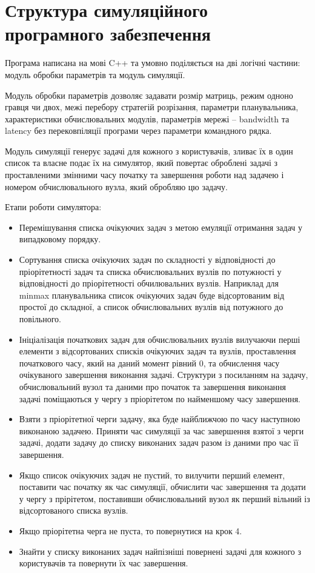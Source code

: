 \section{Структура симуляційного програмного забезпечення}

Програма написана на мові C++ та умовно поділяється на дві логічні частини: модуль обробки параметрів та модуль симуляції.

Модуль обробки параметрів дозволяє задавати розмір матриць, режим одноно гравця чи двох, межі перебору стратегій розрізання, параметри планувальника, характеристики обчислювальних модулів, параметрів мережі – bandwidth та latency без перековпіляції програми через параметри командного рядка.

Модуль симуляції генерує задачі для кожного з користувачів, зливає їх в один список та власне подає їх на симулятор, який повертає оброблені задачі з проставленими змінними часу початку та завершення роботи над задачею і номером обчислювального вузла, який обробляю цю  задачу.

Етапи роботи симулятора:
\begin{itemize}
	\item Перемішування списка очікуючих задач з метою емуляцїї отримання задач у випадковому порядку.
	
	\item Сортування списка очікуючих задач по складності у відповідності до пріорітетності задач та списка обчислювальних вузлів по потужності у відповідності до пріорітетності обчилювальних вузлів. Наприклад для minmax планувальника список очікуючих задач буде відсортованим від простої до складної, а список обчислювальних вузлів від потужного до повільного.
	
	\item Ініціалізація початкових задач для обчислювальних вузлів вилучаючи перші елементи з  відсортованих списків очікуючих задач та вузлів, проставлення початкового часу, який на даний момент рівний 0, та обчислення часу очікуваного завершення виконання задачі. Структури з посиланням на задачу, обчислювальний вузол та даними про початок та завершення виконання задачі поміщаються у чергу з пріорітетом по найменшому часу завершення.
	
	\item Взяти з пріорітетної черги задачу, яка буде найближчою по часу наступною виконаною задачею. Приняти час симуляції за час завершення взятої з черги задачі, додати задачу до списку виконаних задач разом із даними про час її завершення.
	
	\item Якщо список очікуючих задач не пустий, то вилучити перший елемент, поставити час початку як час симуляції, обчислити час завершення та додати у чергу з прірітетом, поставивши обчислювальний вузол як перший вільний із відсортованого списка вузлів.
	
	\item Якщо пріорітетна черга не пуста, то повернутися на крок 4.
	
	\item Знайти у списку виконаних задач найпізніші повернені задачі для кожного з користувачів та повернути їх час завершення.
\end{itemize}

